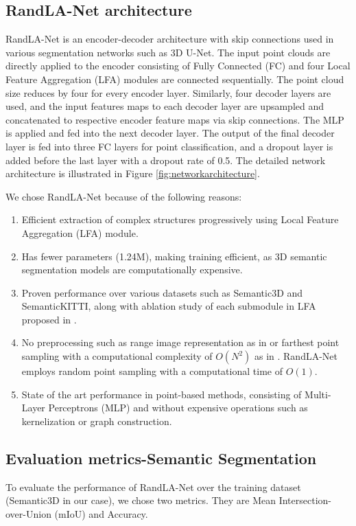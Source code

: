 \subsection{RandLA-Net architecture}
RandLA-Net is an encoder-decoder architecture with skip connections used in various segmentation networks such as 3D U-Net\cite{wang2018two_3DUnet}.
The input point clouds are directly applied to the encoder consisting of Fully Connected (FC) and four Local Feature Aggregation (LFA) modules are connected sequentially.
The point cloud size reduces by four for every encoder layer. 
Similarly, four decoder layers are used, and the input features maps to each decoder layer are upsampled and concatenated to respective encoder feature maps via skip connections.
The MLP is applied and fed into the next decoder layer.
The output of the final decoder layer is fed into three FC layers for point classification, and a dropout layer is added before the last layer with a dropout rate of 0.5.
The detailed network architecture is illustrated in Figure \ref{fig:networkarchitecture}.

We chose RandLA-Net because of the following reasons:
\begin{enumerate}
    \item Efficient extraction of complex structures progressively using Local Feature Aggregation (LFA) module.
    \item Has fewer parameters (1.24M), making training efficient, as 3D semantic segmentation models are computationally expensive.
    \item Proven performance over various datasets such as Semantic3D and SemanticKITTI, along with ablation study of each submodule in LFA proposed in \cite{Hu_2020_CVPR_Randla}.
    \item No preprocessing such as range image representation as in \cite{Milioto2019} or farthest point sampling with a computational complexity of $O(N^2)$ as in \cite{Qi_2017_CVPR_pointnet}. RandLA-Net employs random point sampling with a computational time of $O(1)$.
    \item State of the art performance in point-based methods, consisting of Multi-Layer Perceptrons (MLP) and without expensive operations such as kernelization or graph construction.
\end{enumerate}

\subsection{Evaluation metrics-Semantic Segmentation}
To evaluate the performance of RandLA-Net over the training dataset (Semantic3D in our case), we chose two metrics.
They are Mean Intersection-over-Union (mIoU) and Accuracy.

